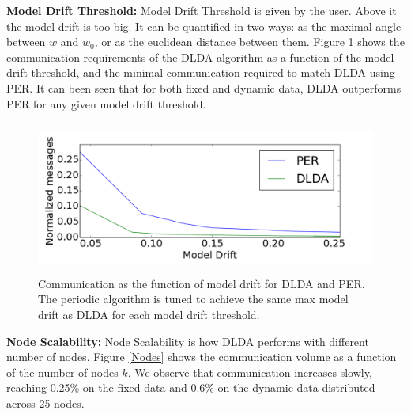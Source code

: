 \documentclass{vldb}
\begin{document}
\noindent\textbf{Model Drift Threshold:} Model Drift Threshold is given by the user. Above it the model drift is too big. It can be quantified in two ways: as the maximal angle between $w$ and $w_0$, or as the euclidean distance between them. 
Figure \ref{PERvsDLDAoverError} shows the communication requirements of the DLDA algorithm as a function of the model drift threshold, and the minimal communication required to match DLDA using PER.	
It can been seen that for both fixed and dynamic data, DLDA outperforms PER for
any given model drift threshold.
 \begin{figure}[ht]
	\centering
	\includegraphics[width=120mm, height=5cm]{PER/onlyDrift.png}
	\caption{Communication as the function of model drift for DLDA and PER. The
	periodic algorithm is tuned to achieve the same max model drift as DLDA
	for each model drift threshold.}
	\label{PERvsDLDAoverError}
	\end{figure}

	
\noindent\textbf{Node Scalability:}
Node Scalability is how DLDA performs with different number of nodes.
Figure \ref{Nodes} shows the communication volume as a function of the number of nodes $k$.
We observe that communication increases slowly, reaching 0.25\% on the fixed
data and 0.6\% on the dynamic data distributed across 25 nodes.
\end{document}
